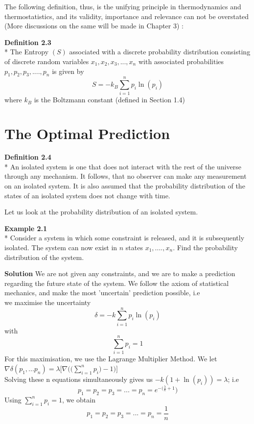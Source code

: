 \documentclass[oneside]{book}
\begin{document}
 The following definition, thus, is the unifying principle in thermodynamics and thermostatistics, and its validity, importance and relevance can not be overstated (More discussions on the same will be made in Chapter 3) :

\begin{mdframed}[style=exercise]
\textbf{Definition 2.3}
 \\* The Entropy $(S)$ associated with a discrete probability distribution consisting of discrete random variables $x_1,x_2,x_3,...,x_n$ with associated probabilities $p_1,p_2,p_3,....,p_n$ is given by
 \[ S = -k_B\sum_{i= 1}^{n}p_i\ln(p_i) \]
 where $k_B$ is the Boltzmann constant (defined in Section 1.4)
 \end{mdframed}
 




\section{The Optimal Prediction}

 \begin{mdframed}[style=exercise]
\textbf{Definition 2.4}
 \\* An isolated system is one that does not interact with the rest of the universe through any mechanism. It follows, that no observer can make any measurement on an isolated system. It is also assumed that the probability distribution of the states of an isolated system does not change with time.
 \end{mdframed}
Let us look at the probability distribution of an isolated system.

\begin{mdframed}[style=exercise]
\textbf{Example 2.1}
 \\* Consider a system in which some constraint is released, and it is subsequently isolated. The system can now exist in $n$ states $x_1,....,x_n$. Find the probability distribution of the system.
 \end{mdframed}
 \textbf{Solution} We are not given any constraints, and we are to make a prediction regarding the future state of the system. We follow the axiom of statistical mechanics, and make the most 'uncertain' prediction possible, i.e\\
 we maximise the uncertainty
 \[ \delta = -k\sum_{i= 1}^{n}p_i\ln(p_i)\]
 with
 \[\sum_{i =1}^{n}p_i = 1 \]
 For this maximisation, we use the Lagrange Multiplier Method. We let $\nabla \delta(p_1,...p_n) = \lambda \Bigg[\nabla \Big(\big(\sum_{i =1}^{n}p_i \big)- 1\Big)\Bigg]$\\
 Solving these n equations simultaneously gives us $-k(1 + \ln(p_i) )= \lambda$; i.e 
 \[p_1 = p_2 = p_3 = ... = p_n = e^{-(\frac{\lambda}{k} + 1}) \]
 Using $\sum_{i =1}^{n}p_i = 1$, we obtain 
  \[p_1 = p_2 = p_3 = ... = p_n = \frac{1}{n} \] \\
  
\end{document}
